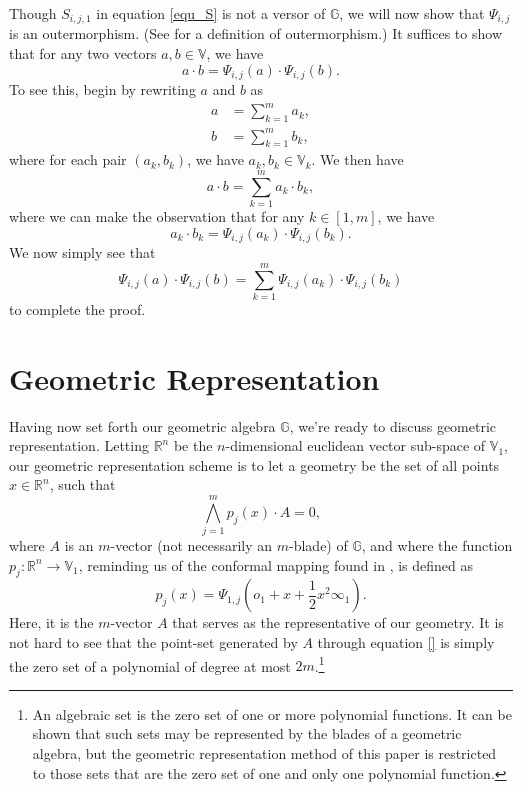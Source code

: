 \documentclass{ecgd-l}
\theoremstyle{definition}
\theoremstyle{remark}
\numberwithin{equation}{section}
\newcommand{\G}{\mathbb{G}}
\newcommand{\V}{\mathbb{V}}
\newcommand{\R}{\mathbb{R}}
\newcommand{\nvai}{\infty}
\newcommand{\nvao}{o}
\begin{document}
Though $S_{i,j,1}$ in equation \eqref{equ_S} is not a versor of $\G$, we will now show that $\Psi_{i,j}$ is an outermorphism.
(See \cite{} for a definition of outermorphism.)  It suffices to show that
for any two vectors $a,b\in\V$, we have
\begin{equation*}
a\cdot b = \Psi_{i,j}(a)\cdot \Psi_{i,j}(b).
\end{equation*}
To see this, begin by rewriting $a$ and $b$ as
\begin{align*}
a &= \sum_{k=1}^m a_k, \\
b &= \sum_{k=1}^m b_k,
\end{align*}
where for each pair $(a_k,b_k)$, we have $a_k,b_k\in\V_k$.  We then have
\begin{equation*}
a\cdot b=\sum_{k=1}^m a_k\cdot b_k,
\end{equation*}
where we can make the observation that for any $k\in[1,m]$, we have
\begin{equation*}
a_k\cdot b_k = \Psi_{i,j}(a_k)\cdot\Psi_{i,j}(b_k).
\end{equation*}
We now simply see that
\begin{equation*}
\Psi_{i,j}(a)\cdot\Psi_{i,j}(b)=\sum_{k=1}^m\Psi_{i,j}(a_k)\cdot\Psi_{i,j}(b_k)
\end{equation*}
to complete the proof.

\section{Geometric Representation}

Having now set forth our geometric algebra $\G$, we're ready to discuss
geometric representation.
Letting $\R^n$ be the $n$-dimensional euclidean vector sub-space
of $\V_1$, our geometric representation scheme is to let a geometry be the
set of all points $x\in\R^n$, such that
\begin{equation*}
\bigwedge_{j=1}^m p_j(x)\cdot A=0,
\end{equation*}
where $A$ is an $m$-vector (not necessarily an $m$-blade) of $\G$, and
where the function $p_j:\R^n\to\V_1$, reminding us of the conformal mapping found in \cite{}, is defined as
\begin{equation*}
p_j(x)=\Psi_{1,j}\left(\nvao_1+x+\frac{1}{2}x^2\nvai_1\right).
\end{equation*}
Here, it is the $m$-vector $A$ that serves as the representative of our geometry.
It is not hard to see that the point-set generated by $A$ through equation \eqref{}
is simply the zero set of a polynomial of degree at most $2m$.\footnote{An algebraic
set is the zero set of one or more polynomial functions.  It can be shown that such sets may be represented by
the blades of a geometric algebra, but the geometric representation method of this paper is restricted to those sets
that are the zero set of one and only one polynomial function.}
\end{document}
